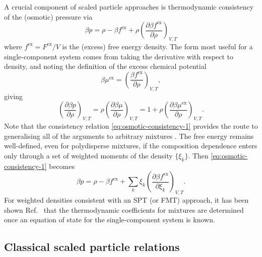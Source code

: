 \documentclass[11pt,twoside]{report}
\begin{document}
A crucial component of scaled particle approaches is thermodynamic consistency of the (osmotic) pressure via
\begin{equation}\label{eq:osmotic-consistency-1}
  \beta p
  =
  \rho - \beta f^\mathrm{ex}
  + \rho \left( \frac{\partial \beta f^\mathrm{ex}}{\partial \rho} \right)_{V,T}
\end{equation}
where $f^\mathrm{ex} = F^\mathrm{ex}/V$ is the (excess) free energy density.
The form most useful for a single-component system comes from taking the derivative with respect to density, and noting the definition of the excess chemical potential
\begin{equation*}
  \beta \mu^\mathrm{ex}
  =
  \left( \frac{\beta f^\mathrm{ex}}{\partial \rho} \right)_{V,T},
\end{equation*}
giving
\begin{equation}\label{eq:osmotic-consistency-2}
    \left( \frac{\partial \beta p}{\partial \rho} \right)_{V,T}
    =
    \rho \left( \frac{\partial \beta \mu}{\partial \rho} \right)_{V,T}
    =
    1 + \rho \left( \frac{\partial \beta \mu^\mathrm{ex}}{\partial \rho} \right)_{V,T}.
\end{equation}
Note that the consistency relation \eqref{eq:osmotic-consistency-1} provides the route to generalising all of the arguments to arbitrary mixtures \cite{RosenfeldPRL1989,SollichAiCP2001,SantosPRE2012}.
The free energy remains well-defined, even for polydisperse mixtures, if the composition dependence enters only through a set of weighted moments of the density $\{\xi_k\}$.
Then \eqref{eq:osmotic-consistency-1} becomes
\begin{equation}\label{eq:osmotic-consistency-3}
  \beta p
  =
  \rho - \beta f^\mathrm{ex}
  + \sum_k
  \xi_k \left( \frac{\partial \beta f^\mathrm{ex}}{\partial \xi_k} \right)_{V,T}.
\end{equation}
For weighted densities consistent with an SPT (or FMT) approach, it has been shown Ref.\ \cite{SantosPRE2012} that the thermodynamic coefficients for mixtures are determined once an equation of state for the single-component system is known.

\subsection{Classical scaled particle relations}
\label{sec:classical-spt}
\end{document}
